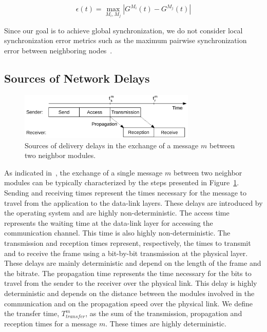 \begin{equation}
\epsilon(t) = \max\limits_{M_i,M_j}  \left|G^{M_i}(t) - G^{M_j}(t)\right|
\end{equation}

Since our goal is to achieve global synchronization, we do not consider local synchronization error metrics such as the maximum pairwise synchronization error between neighboring nodes~\cite{lenzen2009optimal}.

\subsection{Sources of Network Delays}
\label{section:time-sync:msg-decomposition}

\begin{figure}[h!]
	\centering
	\includegraphics[width=0.75\textwidth]{images/time-synchronization/delays.pdf}
	\caption{Sources of delivery delays in the exchange of a message $m$ between two neighbor modules.\label{fig:time-sync:delay-decomposition}}
\end{figure}


As indicated in~\cite{ganeriwal2003timing,maroti2004flooding,amundson2008time}, the exchange of a single message $m$ between two neighbor modules can be typically characterized by the steps presented in Figure~\ref{fig:time-sync:delay-decomposition}. Sending and receiving times represent the times necessary for the message to travel from the application to the data-link layers. These delays are introduced by the operating system and are highly non-deterministic. The access time represents the waiting time at the data-link layer for accessing the communication channel. This time is also highly non-deterministic. The transmission and reception times represent, respectively, the times to transmit and to receive the frame using a bit-by-bit transmission at the physical layer. These delays are mainly deterministic and depend on the length of the frame and the bitrate. The propagation time represents the time necessary for the bits to travel from the sender to the receiver over the physical link. This delay is highly deterministic and depends on the distance between the modules involved in the communication and on the propagation speed over the physical link. We define the transfer time, $T_{transfer}^m$, as the sum of the transmission, propagation and reception times for a message $m$. These times are highly deterministic.

